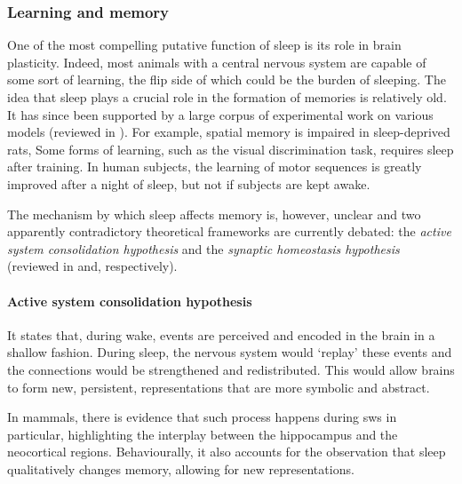 \subsubsection{Learning and memory}

One of the most compelling putative function of sleep is its role in brain plasticity.
Indeed, most animals with a central nervous system are capable of some sort of learning, the flip side of which could be the burden of sleeping.
The idea that sleep plays a crucial role in the formation of memories is relatively old\cite{jenkins_obliviscence_1924}.
It has since been supported by a large corpus of experimental work on various models (reviewed in \cite{stickgold_sleep-dependent_2005}).
For example, spatial memory is impaired in sleep-deprived rats\cite{smith_evidence_1996},
Some forms of learning, such as the visual discrimination task, requires sleep after training\cite{stickgold_visual_2000}.
In human subjects, the learning of motor sequences is greatly improved after a night of sleep\cite{walker_practice_2002}, but not if subjects are kept awake\cite{walker_sleep_2003}.

The mechanism by which sleep affects memory is, however, unclear and two apparently contradictory theoretical 
frameworks are currently debated: the \emph{active system consolidation hypothesis} and the \emph{synaptic homeostasis hypothesis} (reviewed in \cite{diekelmann_memory_2010} and\cite{tononi_sleep_2014}, respectively).

\paragraph*{Active system consolidation hypothesis}
It states that, during wake, events are perceived and encoded in the brain in a shallow fashion.
During sleep, the nervous system would `replay' these events and the connections would be strengthened and redistributed\cite{mcclelland_why_1995,marshall_contribution_2007}.
This would allow brains to form new, persistent, representations that are more symbolic and abstract\cite{rasch_maintaining_2007,diekelmann_memory_2010}.

In mammals, there is evidence that such process happens during \gls{sws} in particular, highlighting the interplay between the hippocampus and the neocortical regions\cite{rasch_odor_2007,girardeau_selective_2009}.
Behaviourally, it also accounts for the observation that sleep qualitatively changes memory, allowing for new representations\cite{ellenbogen_human_2007,wagner_sleep_2004}.

